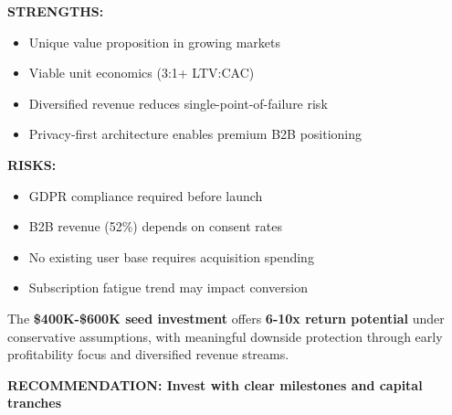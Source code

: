\documentclass[11pt,a4paper]{article}
\begin{document}
\vspace{15pt}

\begin{minipage}[t]{0.48\textwidth}
\begin{successbox}
\textbf{\textcolor{milogreen}{STRENGTHS:}}
\begin{itemize}[leftmargin=15pt, itemsep=3pt]
    \item[\textcolor{milogreen}{\faIcon{check}}] Unique value proposition in growing markets
    \item[\textcolor{milogreen}{\faIcon{check}}] Viable unit economics (3:1+ LTV:CAC)
    \item[\textcolor{milogreen}{\faIcon{check}}] Diversified revenue reduces single-point-of-failure risk
    \item[\textcolor{milogreen}{\faIcon{check}}] Privacy-first architecture enables premium B2B positioning
\end{itemize}
\end{successbox}
\end{minipage}
\hfill
\begin{minipage}[t]{0.48\textwidth}
\begin{riskbox}
\textbf{\textcolor{milored}{RISKS:}}
\begin{itemize}[leftmargin=15pt, itemsep=3pt]
    \item[\textcolor{milored}{\faIcon{times}}] GDPR compliance required before launch
    \item[\textcolor{milored}{\faIcon{times}}] B2B revenue (52\%) depends on consent rates
    \item[\textcolor{milored}{\faIcon{times}}] No existing user base requires acquisition spending
    \item[\textcolor{milored}{\faIcon{times}}] Subscription fatigue trend may impact conversion
\end{itemize}
\end{riskbox}
\end{minipage}

\vspace{20pt}

\begin{accentbox}
\begin{center}
The \textbf{\$400K-\$600K seed investment} offers \textbf{6-10x return potential} under conservative assumptions, with meaningful downside protection through early profitability focus and diversified revenue streams.

\vspace{10pt}
{\Large\bfseries\textcolor{miloaccent}{RECOMMENDATION: Invest with clear milestones and capital tranches}}
\end{center}
\end{accentbox}
\end{document}
